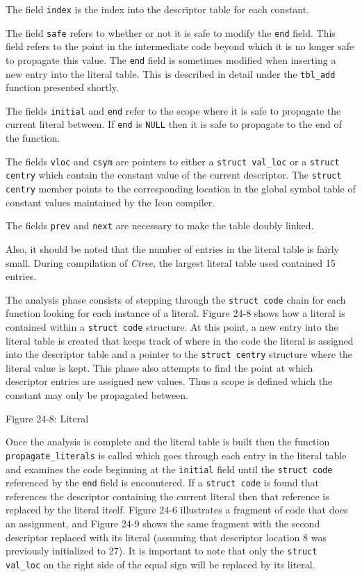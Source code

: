 The field \texttt{index} is the index into the descriptor table for
each constant.


The field \texttt{safe} refers to whether or not it is safe to modify
the \texttt{end} field. This field refers to the point in the
intermediate code beyond which it is no longer safe to propagate this
value. The \texttt{end} field is sometimes modified when inserting a
new entry into the literal table. This is described in detail under
the \texttt{tbl\_add} function presented shortly.


The fields \texttt{initial} and \texttt{end} refer to the scope where
it is safe to propagate the current literal between. If \texttt{end}
is \texttt{NULL} then it is safe to propagate to the end of the
function.


The fields \texttt{vloc} and \texttt{csym} are pointers to either a
\texttt{struct val\_loc} or a \texttt{struct centry} which contain the
constant value of the current descriptor. The \texttt{struct centry}
member points to the corresponding location in the global symbol table
of constant values maintained by the Icon compiler.

The fields \texttt{prev} and \texttt{next} are necessary to make the
table doubly linked.

Also, it should be noted that the number of entries in the literal
table is fairly small. During compilation of \textit{Ctree}, the
largest literal table used contained 15 entries.

The analysis phase consists of stepping through the \texttt{struct
code} chain for each function looking for each instance of a
literal. Figure 24-8 shows how a literal is contained within a
\texttt{struct code} structure. At this point, a new entry into the
literal table is created that keeps track of where in the code the
literal is assigned into the descriptor table and a pointer to the
\texttt{struct centry} structure where the literal value is kept.
This phase also attempts to find the point at which descriptor entries
are assigned new values. Thus a scope is defined which the constant
may only be propagated between.


\bigskip

{\centering{}
Figure 24-8: Literal
\par}


Once the analysis is complete and the literal table is built then the
function \texttt{propagate\_literals} is called which goes through
each entry in the literal table and examines the code beginning at the
\texttt{initial} field until the \texttt{struct code} referenced by
the \texttt{end} field is encountered. If a \texttt{struct code} is
found that references the descriptor containing the current literal
then that reference is replaced by the literal itself. Figure 24-6
illustrates a fragment of code that does an assignment, and Figure
24-9 shows the same fragment with the second descriptor replaced with
its literal (assuming that descriptor location 8 was previously
initialized to 27). It is important to note that only the
\texttt{struct val\_loc} on the right side of the equal sign will be
replaced by its literal.


